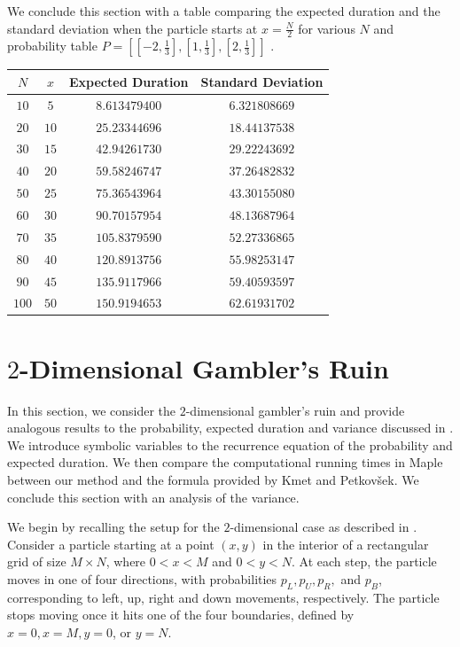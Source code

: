 \documentclass[reqno]{amsart}
\theoremstyle{definition}
\theoremstyle{definition}
\theoremstyle{remark}
\begin{document}
We conclude this section with a table comparing the expected duration and the standard deviation when the particle starts at $x=\frac{N}{2}$ for various $N$ and probability table $P=[[-2,\frac{1}{3}],[1,\frac{1}{3}],[2,\frac{1}{3}]]$ .


\begin{table}[H]
\centering
\begin{tabular}{|c|c|c|c|}
\hline
$N$ & $x$ & Expected Duration& Standard Deviation \\
\hline
$10$ & $5$ & $ 8.613479400$ & $ 6.321808669$\\\hline
$20$ & $10$ & $  25.23344696$ & $18.44137538$\\ \hline
$30$ & $15$ & $42.94261730$ & $ 29.22243692$\\ \hline
$40$ & $20$ & $59.58246747$ & $ 37.26482832$ \\ \hline
$50$ & $25$ & $75.36543964$ & $ 43.30155080$\\ \hline
$60$ & $30$ & $90.70157954$ & $48.13687964$\\ \hline
$70$ & $35$ & $105.8379590$ & $52.27336865 $\\ \hline
$80$ & $40$ & $120.8913756$ & $55.98253147$\\ \hline
$90$ & $45$ & $135.9117966$ & $59.40593597$\\ \hline
$100$ & $50$ & $150.9194653$ & $62.61931702$ \\ \hline
\end{tabular}
\end{table}

\section{$2$-Dimensional Gambler's Ruin}\label{sec:2d case}

In this section, we consider the $2$-dimensional gambler's ruin and provide analogous results to the probability, expected duration and variance discussed in . We introduce symbolic variables to the recurrence equation of the probability and expected duration. We then compare the computational running times in Maple between our method and the formula provided by Kmet and Petkov\v{s}ek. We conclude this section with an analysis of the variance.

We begin by recalling the setup for the $2$-dimensional case as described in . Consider a particle starting at a point $(x,y)$ in the interior of a rectangular grid of size $M\times N$, where $0<x<M$ and $0<y<N$. At each step, the particle moves in one of four directions, with probabilities $p_L, p_U, p_R,$ and $p_B$, corresponding to left, up, right and down movements, respectively. The particle stops moving once it hits one of the four boundaries, defined by $x=0, x=M, y=0$, or $y=N$. 
\end{document}
